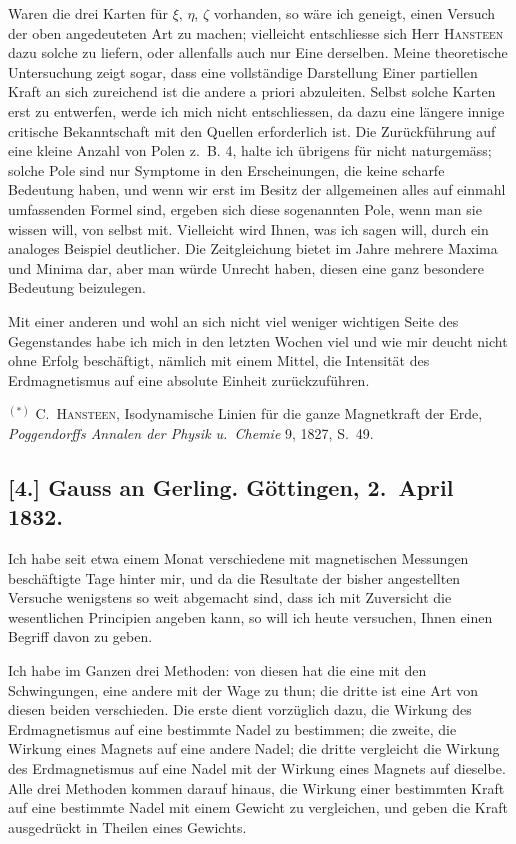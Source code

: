 \documentclass[12pt,a4paper]{article}
\begin{document}
Waren die drei Karten f\"ur $\xi$, $\eta$, $\zeta$ vorhanden, so w\"are ich geneigt, einen Versuch der oben angedeuteten Art zu machen; vielleicht entschliesse sich Herr \textsc{Hansteen} dazu solche zu liefern, oder allenfalls auch nur Eine derselben. Meine theoretische Untersuchung zeigt sogar, dass eine vollst\"andige Darstellung Einer partiellen Kraft an sich zureichend ist die andere a priori abzuleiten. Selbst solche Karten erst zu entwerfen, werde ich mich nicht entschliessen, da dazu eine l\"angere innige critische Bekanntschaft mit den Quellen erforderlich ist. Die Zur\"uckf\"uhrung auf eine kleine Anzahl von Polen z.~B. 4, halte ich \"ubrigens f\"ur nicht naturgem\"ass; solche Pole sind nur Symptome in den Erscheinungen, die keine scharfe Bedeutung haben, und wenn wir erst im Besitz der allgemeinen alles auf einmahl umfassenden Formel sind, ergeben sich diese sogenannten Pole, wenn man sie wissen will, von selbst mit. Vielleicht wird Ihnen, was ich sagen will, durch ein analoges Beispiel deutlicher. Die Zeitgleichung bietet im Jahre mehrere Maxima und Minima dar, aber man w\"urde Unrecht haben, diesen eine ganz besondere Bedeutung beizulegen.

Mit einer anderen und wohl an sich nicht viel weniger wichtigen Seite des Gegenstandes habe ich mich in den letzten Wochen viel und wie mir deucht nicht ohne Erfolg besch\"aftigt, n\"amlich mit einem Mittel, die Intensit\"at des Erdmagnetismus auf eine absolute Einheit zur\"uckzuf\"uhren.

\medskip\noindent
$^{(*)}$ C.~\textsc{Hansteen}, Isodynamische Linien f\"ur die ganze Magnetkraft der Erde, \textit{Poggendorffs Annalen der Physik u.~Chemie} 9, 1827, S.~49.


\subsection*{[4.] Gauss an Gerling. G\"ottingen, 2.~April 1832.}

Ich habe seit etwa einem Monat verschiedene mit magnetischen Messungen besch\"aftigte Tage hinter mir, und da die Resultate der bisher angestellten Versuche wenigstens so weit abgemacht sind, dass ich mit Zuversicht die wesentlichen Principien angeben kann, so will ich heute versuchen, Ihnen einen Begriff davon zu geben.

Ich habe im Ganzen drei Methoden: von diesen hat die eine mit den Schwingungen, eine andere mit der Wage zu thun; die dritte ist eine Art von diesen beiden verschieden. Die erste dient vorz\"uglich dazu, die Wirkung des Erdmagnetismus auf eine bestimmte Nadel zu bestimmen; die zweite, die Wirkung eines Magnets auf eine andere Nadel; die dritte vergleicht die Wirkung des Erdmagnetismus auf eine Nadel mit der Wirkung eines Magnets auf dieselbe. Alle drei Methoden kommen darauf hinaus, die Wirkung einer bestimmten Kraft auf eine bestimmte Nadel mit einem Gewicht zu vergleichen, und geben die Kraft ausgedr\"uckt in Theilen eines Gewichts.
\end{document}
